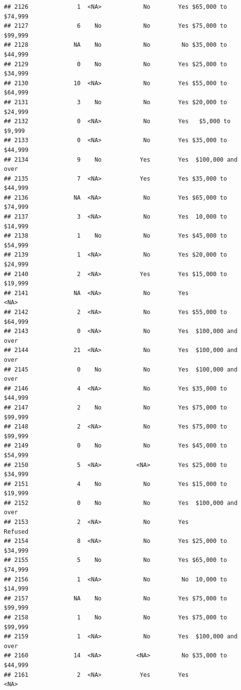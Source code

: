 \documentclass[man]{apa6}
\begin{document}
\begin{verbatim}
## 2126              1  <NA>            No        Yes $65,000 to $74,999
## 2127              6    No            No        Yes $75,000 to $99,999
## 2128             NA    No            No         No $35,000 to $44,999
## 2129              0    No            No        Yes $25,000 to $34,999
## 2130             10  <NA>            No        Yes $55,000 to $64,999
## 2131              3    No            No        Yes $20,000 to $24,999
## 2132              0  <NA>            No        Yes   $5,000 to $9,999
## 2133              0  <NA>            No        Yes $35,000 to $44,999
## 2134              9    No           Yes        Yes  $100,000 and over
## 2135              7  <NA>           Yes        Yes $35,000 to $44,999
## 2136             NA  <NA>            No        Yes $65,000 to $74,999
## 2137              3  <NA>            No        Yes  10,000 to $14,999
## 2138              1    No            No        Yes $45,000 to $54,999
## 2139              1  <NA>            No        Yes $20,000 to $24,999
## 2140              2  <NA>           Yes        Yes $15,000 to $19,999
## 2141             NA  <NA>            No        Yes               <NA>
## 2142              2  <NA>            No        Yes $55,000 to $64,999
## 2143              0  <NA>            No        Yes  $100,000 and over
## 2144             21  <NA>            No        Yes  $100,000 and over
## 2145              0    No            No        Yes  $100,000 and over
## 2146              4  <NA>            No        Yes $35,000 to $44,999
## 2147              2    No            No        Yes $75,000 to $99,999
## 2148              2  <NA>            No        Yes $75,000 to $99,999
## 2149              0    No            No        Yes $45,000 to $54,999
## 2150              5  <NA>          <NA>        Yes $25,000 to $34,999
## 2151              4    No            No        Yes $15,000 to $19,999
## 2152              0    No            No        Yes  $100,000 and over
## 2153              2  <NA>            No        Yes            Refused
## 2154              8  <NA>            No        Yes $25,000 to $34,999
## 2155              5    No            No        Yes $65,000 to $74,999
## 2156              1  <NA>            No         No  10,000 to $14,999
## 2157             NA    No            No        Yes $75,000 to $99,999
## 2158              1    No            No        Yes $75,000 to $99,999
## 2159              1  <NA>            No        Yes  $100,000 and over
## 2160             14  <NA>          <NA>         No $35,000 to $44,999
## 2161              2  <NA>           Yes        Yes               <NA>

\end{verbatim}
\end{document}
